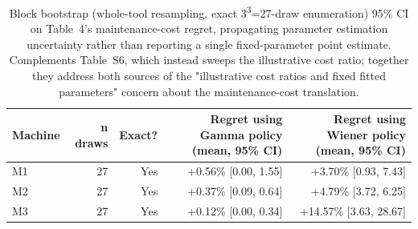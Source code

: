 \begin{table}[t]
\centering
\caption{Block bootstrap (whole-tool resampling, exact 3\textsuperscript{3}=27-draw enumeration) 95\% CI on Table~4's maintenance-cost regret, propagating parameter estimation uncertainty rather than reporting a single fixed-parameter point estimate. Complements Table~S6, which instead sweeps the illustrative cost ratio; together they address both sources of the "illustrative cost ratios and fixed fitted parameters" concern about the maintenance-cost translation.}
\label{tab:maintenance-cost-regret-bootstrap}
\begin{tabular}{lrrrr}
\toprule
Machine & n draws & Exact? & Regret using Gamma policy (mean, 95\% CI) & Regret using Wiener policy (mean, 95\% CI) \\
\midrule
M1 & 27 & Yes & +0.56\% [0.00, 1.55] & +3.70\% [0.93, 7.43] \\
M2 & 27 & Yes & +0.37\% [0.09, 0.64] & +4.79\% [3.72, 6.25] \\
M3 & 27 & Yes & +0.12\% [0.00, 0.34] & +14.57\% [3.63, 28.67] \\
\bottomrule
\end{tabular}
\end{table}
